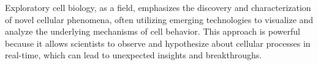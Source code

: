 


%
\label{sec:summarising_discussion}%
% 
% 
%
\label{sec:discussion_potential_breakthroughs}%
Exploratory cell biology, as a field, emphasizes the discovery and
characterization of novel cellular phenomena, often utilizing emerging
technologies to visualize and analyze the underlying mechanisms of cell
behavior. This approach is powerful because it allows scientists to observe and
hypothesize about cellular processes in real-time, which can lead to unexpected
insights and breakthroughs.


